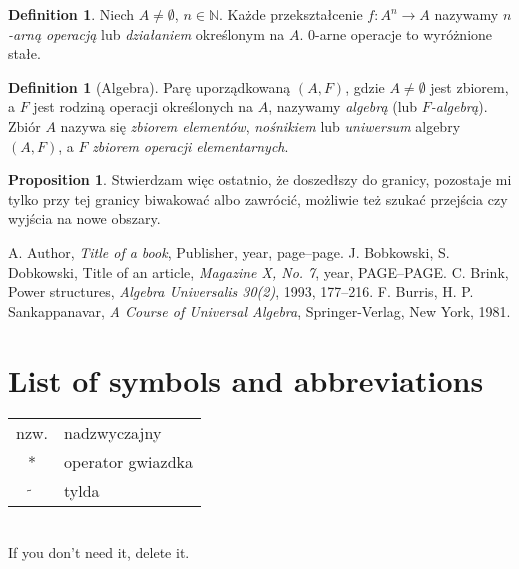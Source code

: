 \documentclass[a4paper,11pt,twoside]{report}
\theoremstyle{definition}
\newtheorem{proposition}[theorem]{Proposition}
\newtheorem{definition}[theorem]{Definition}
\begin{document}
\begin{definition}
Niech $A\neq \emptyset$, $n \in \mathbb{N}$. Każde przekształcenie $f:A^n \rightarrow A$ nazywamy \textit{$n$-arną operacją} lub \textit{działaniem} określonym na $A$.
0-arne operacje to wyróżnione stałe.
\end{definition}


\begin{definition}[Algebra]
Parę uporządkowaną $(A,F)$, gdzie $A\neq \emptyset$ jest zbiorem, a $F$ jest rodziną operacji określonych na $A$, nazywamy \textit{algebrą} (lub \textit{$F$-algebrą}). Zbiór $A$ nazywa się \textit{zbiorem elementów}, \textit{nośnikiem} lub \textit{uniwersum} algebry $(A,F)$, a $F$ \textit{zbiorem operacji elementarnych}.
\end{definition}

\begin{proposition}
Stwierdzam więc ostatnio, że doszedłszy do granicy, pozostaje mi tylko przy tej granicy biwakować albo zawrócić, możliwie też szukać przejścia czy wyjścia na nowe obszary.
\end{proposition}







\begin{thebibliography}{20} %

 A. Author, \emph{Title of a book}, Publisher, year, page--page.
 J. Bobkowski, S. Dobkowski, Title of an article, \emph{Magazine X, No. 7}, year, PAGE--PAGE.
 C. Brink, Power structures, \emph{Algebra Universalis 30(2)}, 1993, 177--216.
 F. Burris, H. P. Sankappanavar, \emph{A Course of Universal Algebra}, Springer-Verlag, New York, 1981.
\end{thebibliography}
\thispagestyle{empty}



\chapter*{List of symbols and abbreviations}

\begin{tabular}{cl}
nzw. & nadzwyczajny \\
* & operator gwiazdka \\
$\widetilde{}$ & tylda
\end{tabular}
\\
If you don't need it, delete it.
\thispagestyle{empty}
\end{document}

